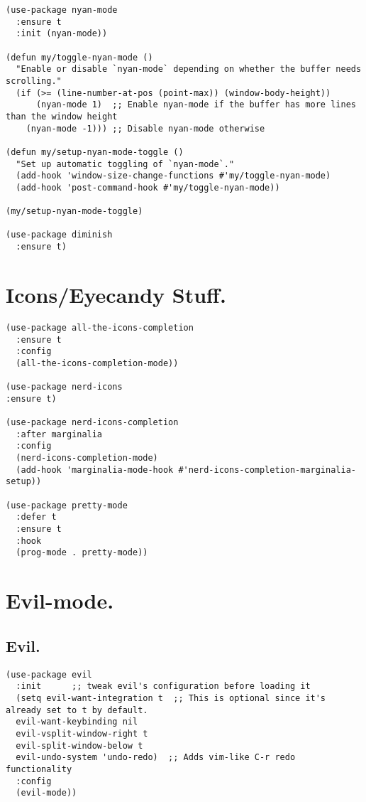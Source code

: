 \documentclass[11pt]{article}
\begin{document}
\begin{verbatim}
(use-package nyan-mode
  :ensure t
  :init (nyan-mode))

(defun my/toggle-nyan-mode ()
  "Enable or disable `nyan-mode` depending on whether the buffer needs scrolling."
  (if (>= (line-number-at-pos (point-max)) (window-body-height))
      (nyan-mode 1)  ;; Enable nyan-mode if the buffer has more lines than the window height
    (nyan-mode -1))) ;; Disable nyan-mode otherwise

(defun my/setup-nyan-mode-toggle ()
  "Set up automatic toggling of `nyan-mode`."
  (add-hook 'window-size-change-functions #'my/toggle-nyan-mode)
  (add-hook 'post-command-hook #'my/toggle-nyan-mode))

(my/setup-nyan-mode-toggle)

(use-package diminish
  :ensure t)
\end{verbatim}
\section{Icons/Eyecandy Stuff.}
\label{sec:orga54fbe0}
\begin{verbatim}
(use-package all-the-icons-completion
  :ensure t
  :config
  (all-the-icons-completion-mode))

(use-package nerd-icons
:ensure t)

(use-package nerd-icons-completion
  :after marginalia
  :config
  (nerd-icons-completion-mode)
  (add-hook 'marginalia-mode-hook #'nerd-icons-completion-marginalia-setup))

(use-package pretty-mode
  :defer t 
  :ensure t
  :hook
  (prog-mode . pretty-mode))
\end{verbatim}
\section{Evil-mode.}
\label{sec:orgc5e8708}
\subsection{Evil.}
\label{sec:org0820642}
\begin{verbatim}
(use-package evil
  :init      ;; tweak evil's configuration before loading it
  (setq evil-want-integration t  ;; This is optional since it's already set to t by default.
  evil-want-keybinding nil
  evil-vsplit-window-right t
  evil-split-window-below t
  evil-undo-system 'undo-redo)  ;; Adds vim-like C-r redo functionality
  :config
  (evil-mode))
\end{verbatim}
\end{document}
